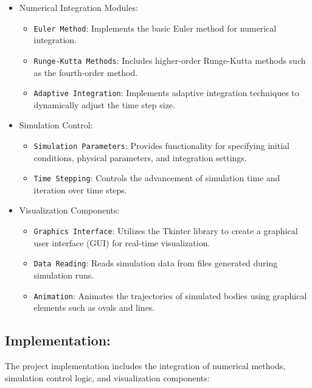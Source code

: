 \documentclass{article}
\begin{document}
\begin{itemize}[label=-]
    \item Numerical Integration Modules:
    \begin{itemize}[label=$\bullet$]
        \item \texttt{Euler Method}: Implements the basic Euler method for numerical integration.
        \item \texttt{Runge-Kutta Methods}: Includes higher-order Runge-Kutta methods such as the fourth-order method.
        \item \texttt{Adaptive Integration}: Implements adaptive integration techniques to dynamically adjust the time step size.
    \end{itemize}
    
    \item Simulation Control:
    \begin{itemize}[label=$\bullet$]
        \item \texttt{Simulation Parameters}: Provides functionality for specifying initial conditions, physical parameters, and integration settings.
        \item \texttt{Time Stepping}: Controls the advancement of simulation time and iteration over time steps.
    \end{itemize}
    
    \item Visualization Components:
    \begin{itemize}[label=$\bullet$]
        \item \texttt{Graphics Interface}: Utilizes the Tkinter library to create a graphical user interface (GUI) for real-time visualization.
        \item \texttt{Data Reading}: Reads simulation data from files generated during simulation runs.
        \item \texttt{Animation}: Animates the trajectories of simulated bodies using graphical elements such as ovals and lines.
    \end{itemize}
\end{itemize}
\newpage
\subsection*{Implementation:}
The project implementation includes the integration of numerical methods, simulation control logic, and visualization components:
\end{document}
